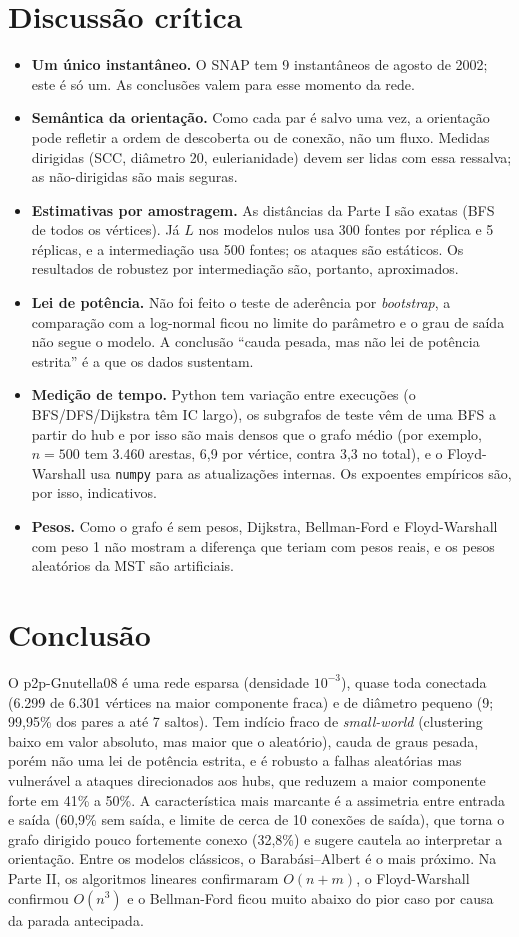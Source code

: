 \documentclass[10pt,a4paper,twocolumn]{article}
\begin{document}
\section{Discussão crítica}
\begin{itemize}
\item \textbf{Um único instantâneo.} O SNAP tem 9 instantâneos de agosto de 2002; este é só um. As conclusões valem para esse momento da rede.
\item \textbf{Semântica da orientação.} Como cada par é salvo uma vez, a orientação pode refletir a ordem de descoberta ou de conexão, não um fluxo. Medidas dirigidas (SCC, diâmetro 20, eulerianidade) devem ser lidas com essa ressalva; as não-dirigidas são mais seguras.
\item \textbf{Estimativas por amostragem.} As distâncias da Parte I são exatas (BFS de todos os vértices). Já $L$ nos modelos nulos usa 300 fontes por réplica e 5 réplicas, e a intermediação usa 500 fontes; os ataques são estáticos. Os resultados de robustez por intermediação são, portanto, aproximados.
\item \textbf{Lei de potência.} Não foi feito o teste de aderência por \emph{bootstrap}, a comparação com a log-normal ficou no limite do parâmetro e o grau de saída não segue o modelo. A conclusão ``cauda pesada, mas não lei de potência estrita'' é a que os dados sustentam.
\item \textbf{Medição de tempo.} Python tem variação entre execuções (o BFS/DFS/Dijkstra têm IC largo), os subgrafos de teste vêm de uma BFS a partir do hub e por isso são mais densos que o grafo médio (por exemplo, $n=500$ tem 3.460 arestas, 6,9 por vértice, contra 3,3 no total), e o Floyd-Warshall usa \texttt{numpy} para as atualizações internas. Os expoentes empíricos são, por isso, indicativos.
\item \textbf{Pesos.} Como o grafo é sem pesos, Dijkstra, Bellman-Ford e Floyd-Warshall com peso 1 não mostram a diferença que teriam com pesos reais, e os pesos aleatórios da MST são artificiais.
\end{itemize}

\section{Conclusão}
O p2p-Gnutella08 é uma rede esparsa (densidade $10^{-3}$), quase toda conectada (6.299 de 6.301 vértices na maior componente fraca) e de diâmetro pequeno (9; 99,95\% dos pares a até 7 saltos). Tem indício fraco de \emph{small-world} (clustering baixo em valor absoluto, mas maior que o aleatório), cauda de graus pesada, porém não uma lei de potência estrita, e é robusto a falhas aleatórias mas vulnerável a ataques direcionados aos hubs, que reduzem a maior componente forte em 41\% a 50\%. A característica mais marcante é a assimetria entre entrada e saída (60,9\% sem saída, e limite de cerca de 10 conexões de saída), que torna o grafo dirigido pouco fortemente conexo (32,8\%) e sugere cautela ao interpretar a orientação. Entre os modelos clássicos, o Barabási--Albert é o mais próximo. Na Parte II, os algoritmos lineares confirmaram $O(n+m)$, o Floyd-Warshall confirmou $O(n^3)$ e o Bellman-Ford ficou muito abaixo do pior caso por causa da parada antecipada.
\end{document}
